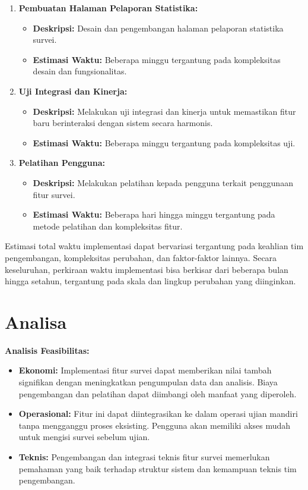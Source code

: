 \documentclass[12pt]{article}
\begin{document}
\begin{enumerate}
  \item \textbf{Pembuatan Halaman Pelaporan Statistika:}
  \begin{itemize}
    \item \textbf{Deskripsi:} Desain dan pengembangan halaman pelaporan statistika survei.
    \item \textbf{Estimasi Waktu:} Beberapa minggu tergantung pada kompleksitas desain dan fungsionalitas.
  \end{itemize}

  \item \textbf{Uji Integrasi dan Kinerja:}
  \begin{itemize}
    \item \textbf{Deskripsi:} Melakukan uji integrasi dan kinerja untuk memastikan fitur baru berinteraksi dengan sistem secara harmonis.
    \item \textbf{Estimasi Waktu:} Beberapa minggu tergantung pada kompleksitas uji.
  \end{itemize}

  \item \textbf{Pelatihan Pengguna:}
  \begin{itemize}
    \item \textbf{Deskripsi:} Melakukan pelatihan kepada pengguna terkait penggunaan fitur survei.
    \item \textbf{Estimasi Waktu:} Beberapa hari hingga minggu tergantung pada metode pelatihan dan kompleksitas fitur.
  \end{itemize}
\end{enumerate}

Estimasi total waktu implementasi dapat bervariasi tergantung pada keahlian tim pengembangan, kompleksitas perubahan, dan faktor-faktor lainnya. Secara keseluruhan, perkiraan waktu implementasi bisa berkisar dari beberapa bulan hingga setahun, tergantung pada skala dan lingkup perubahan yang diinginkan.

\section*{Analisa}
\textbf{Analisis Feasibilitas:}
\begin{itemize}
  \item \textbf{Ekonomi:} Implementasi fitur survei dapat memberikan nilai tambah signifikan dengan meningkatkan pengumpulan data dan analisis. Biaya pengembangan dan pelatihan dapat diimbangi oleh manfaat yang diperoleh.
  \item \textbf{Operasional:} Fitur ini dapat diintegrasikan ke dalam operasi ujian mandiri tanpa mengganggu proses eksisting. Pengguna akan memiliki akses mudah untuk mengisi survei sebelum ujian.
  \item \textbf{Teknis:} Pengembangan dan integrasi teknis fitur survei memerlukan pemahaman yang baik terhadap struktur sistem dan kemampuan teknis tim pengembangan.
\end{itemize}
\end{document}
